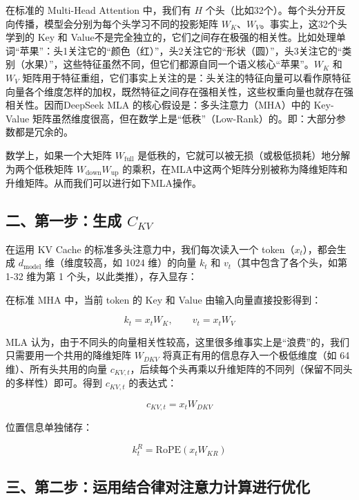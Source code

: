 在标准的 Multi-Head Attention 中，我们有 \(H\) 个头（比如32个）。每个头分开反向传播，模型会分别为每个头学习不同的投影矩阵 \(W_K\)、\(W_V\)。事实上，这32个头学到的 Key 和 Value不是完全独立的，它们之间存在极强的相关性。比如处理单词``苹果''：头1关注它的``颜色（红）''，头2关注它的``形状（圆）''，头3关注它的``类别（水果）''，这些特征虽然不同，但它们都源自同一个语义核心``苹果''。\(W_K\) 和 \(W_V\) 矩阵用于特征重组，它们事实上关注的是：头关注的特征向量可以看作原特征向量各个维度怎样的加权，既然特征之间存在强相关性，这些权重向量也就存在强相关性。因而DeepSeek MLA 的核心假设是：多头注意力（MHA）中的 Key-Value 矩阵虽然维度很高，但在数学上是``低秩''（Low-Rank）的。即：大部分参数都是冗余的。

数学上，如果一个大矩阵 \(W_{\mathrm{full}}\) 是低秩的，它就可以被无损（或极低损耗）地分解为两个低秩矩阵 \(W_{\mathrm{down}}W_{\mathrm{up}}\) 的乘积，在MLA中这两个矩阵分别被称为降维矩阵和升维矩阵。从而我们可以进行如下MLA操作。

\hypertarget{ux4e8cux7b2cux4e00ux6b65ux751fux6210-c_kv}{%
\subsection{\texorpdfstring{二、第一步：生成 \(C_{KV}\)}{二、第一步：生成 C\_\{KV\}}}\label{ux4e8cux7b2cux4e00ux6b65ux751fux6210-c_kv}}

在运用 KV Cache 的标准多头注意力中，我们每次读入一个 token（\(x_t\)），都会生成 \(d_{\mathrm{model}}\) 维（维度较高，如 1024 维）的向量 \(k_t\) 和 \(v_t\)（其中包含了各个头，如第 1-32 维为第 1 个头，以此类推），存入显存：

在标准 MHA 中，当前 token 的 Key 和 Value 由输入向量直接投影得到：

\[
k_t = x_t W_K,\qquad v_t = x_t W_V
\]

MLA 认为，由于不同头的向量相关性较高，这里很多维事实上是``浪费''的，我们只需要用一个共用的降维矩阵 \(W_{DKV}\) 将真正有用的信息存入一个极低维度（如 64 维）、所有头共用的向量 \(c_{KV,t}\)，后续每个头再乘以升维矩阵的不同列（保留不同头的多样性）即可。得到 \(c_{KV,t}\) 的表达式：

\[
c_{KV,t} = x_t W_{DKV}
\]

位置信息单独储存：

\[
k_t^R = \mathrm{RoPE}(x_t W_{KR})
\]

\hypertarget{ux4e09ux7b2cux4e8cux6b65ux8fd0ux7528ux7ed3ux5408ux5f8bux5bf9ux6ce8ux610fux529bux8ba1ux7b97ux8fdbux884cux4f18ux5316}{%
\subsection{三、第二步：运用结合律对注意力计算进行优化}\label{ux4e09ux7b2cux4e8cux6b65ux8fd0ux7528ux7ed3ux5408ux5f8bux5bf9ux6ce8ux610fux529bux8ba1ux7b97ux8fdbux884cux4f18ux5316}}

